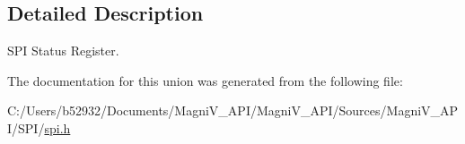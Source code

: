 \subsection{Detailed Description}
S\+P\+I Status Register. 

The documentation for this union was generated from the following file\+:\begin{DoxyCompactItemize}
\item 
C\+:/\+Users/b52932/\+Documents/\+Magni\+V\+\_\+\+A\+P\+I/\+Magni\+V\+\_\+\+A\+P\+I/\+Sources/\+Magni\+V\+\_\+\+A\+P\+I/\+S\+P\+I/\hyperlink{spi_8h}{spi.\+h}\end{DoxyCompactItemize}
